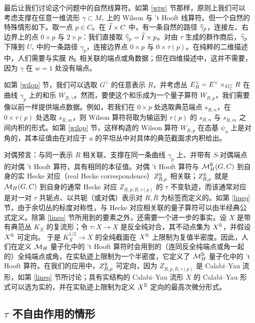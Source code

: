 最后让我们讨论这个问题中的自然线算符。如第 \ref{wtw} 节那样，原则上我们可以考虑支撑在任意一维流形 $\gamma\subset M_\tau$ 上的 Wilson 与 't Hooft 线算符。但一个自然的特殊情形如下。取一点 $p\in C$。在 $\widehat I\times C$ 中，有一条自然的路径 $\widehat\gamma_p$，连接左、右边界上的点 $0\times p$ 与 $2\times p$：我们直接取 $\widehat\gamma_p = \widehat I\times p$。对由 $\tau$ 生成的群作商后，$\widehat\gamma_p$ 下降到 $U_\tau$ 中的一条路径 $\gamma_p$，连接边界点 $0\times p$ 与 $0\times \tau(p)$。在纯粹的二维描述中，人们需要与实膜 ${{\mathcal B}}_{\mathbb R}$ 相关联的端点或角数据；但在四维描述中，这并不需要，因为 $\gamma$ 在 $w=1$ 处没有端点。

如第 \ref{wilop} 节，我们可以选取 $G^\vee$ 的任意表示 $R$，并考虑丛 $E^\vee_R=E^\vee\times_{G^\vee_{\mathbb C}}R$ 在曲线 $\gamma_p$ 上的和乐 $W_{R,\gamma}$。然而，要使这个和乐成为一个量子算符 $W_{R,p}$，我们需要像以前一样提供端点数据。例如，若我们在 $0\times p$ 处选取典范端点 $s_{R,n}$，在 $0\times \tau(p)$ 处选取 $s_{\bar R, m}$，则 Wilson 算符将取为输运到 $\tau(p)$ 的 $s_{R,n}$ 与 $s_{\bar R, m}$ 之间内积的形式。如第 \ref{wilop} 节，这样构造的 Wilson 算符 $W_{R,p}$ 在态基 $\psi_u$ 上是对角的，其本征值由在对应于 $u$ 的平坦丛中对具体的典范截面求内积给出。

对偶预言：与同一表示 $R$ 相关联、支撑在同一条曲线 $\gamma_p$ 上、并带有 $S$-对偶端点的对偶 't Hooft 算符，具有相同的本征值。对偶 't Hooft 算符与 ${\mathcal M}_H^{\mathbb R}(G,C)$ 到自身的实 Hecke 对应（real Hecke correspondence）$Z^{\mathbb R}_{R,p}$ 相关联；$Z^{\mathbb R}_{R,p}$ 就是 ${\mathcal M}_H(G,C)$ 到自身的通常 Hecke 对应 $Z_{R,p;\bar R,\tau(p)}$ 的 $\tau$ 不变轨迹，而该通常对应是对一对 $\tau$ 共轭点、以共轭（或对偶）表示对 $R,\bar R$ 为标签而定义的。如第 \ref{lineq} 节，由于余切丛的标度对称性，与 Hecke 对应相关联的量子算符可以由半经典公式定义。除第 \ref{lineq} 节所用到的要素之外，还需要一个进一步的事实。设 $X$ 是带有典范丛 $K_X$ 的复流形；令 $\tau:X\to X$ 是反全纯对合，其不动点集为 $X^{\mathbb R}$，并假设 $X^{\mathbb R}$ 可定向。 于是 $K_X^{1/2}\to X$ 的全纯截面在 $X^{\mathbb R}$ 上限制为复值半密度。因此，人们在定义 ${\mathcal M}_H$ 量子化中的 't Hooft 算符时会用到的（连同反全纯端点或角一起的）全纯端点或角，在实轨迹上限制为一个半密度，它定义了 ${\mathcal M}_H^{\mathbb R}$ 量子化中的 't Hooft 算符。在我们的应用中，$Z^{\mathbb R}_{R,p}$ 可定向，因为 $Z_{R,p;\bar R,\tau(p)}$ 是 Calabi–Yau 流形，如第 \ref{lineq} 节所讨论；具有实结构的 Calabi–Yau 流形 $X$ 的 Calabi–Yau 形式可以选为实的，并在实轨迹上限制为定义 $X^{\mathbb R}$ 定向的最高次微分形式。

\subsection{$\tau$ 不自由作用的情形}\label{nonfree}

